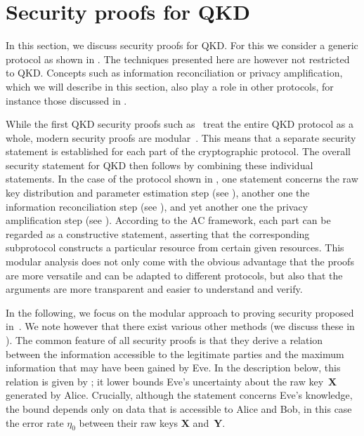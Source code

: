 \section{Security proofs for QKD}
\label{sec:securityproofs}

In this section, we discuss security proofs for QKD. For this we consider a generic protocol as shown in . The techniques presented here are however not restricted to QKD. Concepts such as information reconciliation or privacy amplification, which we will describe in this section, also play a role in other protocols, for instance those discussed in .

While the first QKD security proofs such as~\textcite{May01,SP00} treat  the entire QKD protocol as a whole, modern security proofs are modular~\cite{Ren05}. This means that a separate security statement is established for each part of the cryptographic protocol. The overall security statement for QKD then follows by combining these individual statements.  In the case of the protocol shown in , one statement concerns the raw key distribution and parameter estimation step (see ), another one the information reconciliation step (see ), and yet another one the privacy amplification step (see ). According to the AC framework, each part can be regarded as a constructive statement, asserting that the corresponding subprotocol constructs a particular resource from certain given resources. This modular analysis does not only come with the obvious advantage that the proofs are more versatile and can be adapted to different protocols, but also that the arguments are more transparent and easier to understand and verify.

In the following, we focus on the modular approach to proving security proposed in~\textcite{Ren05}. We note however that there exist various other methods (we discuss these in ). The common feature of all security proofs is that they derive a relation between the information accessible to the legitimate parties and the maximum information that may have been gained by Eve. In the description below, this relation is given by ; it lower bounds Eve's uncertainty about the raw key~$\mathbf{X}$ generated by Alice. Crucially, although the statement concerns Eve's knowledge, the bound depends only on data that is accessible to Alice and Bob, in this case the error rate $\eta_0$  between their raw keys $\mathbf{X}$ and~$\mathbf{Y}$.  

